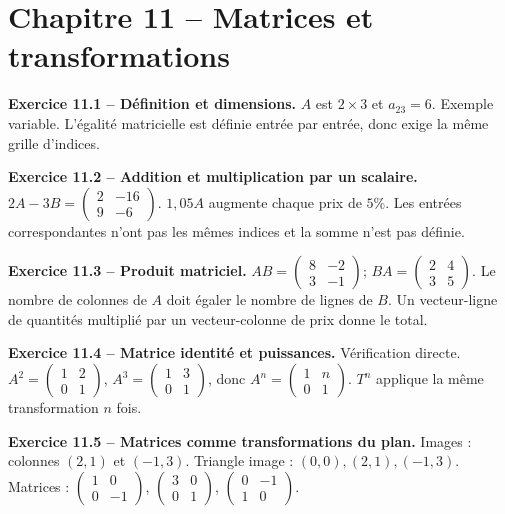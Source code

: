 \documentclass[11pt,a4paper,openany]{book}
\begin{document}
\chapter*{Chapitre 11 -- Matrices et transformations}
\begin{answerbox}
\textbf{Exercice 11.1 -- Définition et dimensions.} $A$ est $2\times3$ et $a_{23}=6$. Exemple variable. L'égalité matricielle est définie entrée par entrée, donc exige la même grille d'indices.\par
\textbf{Exercice 11.2 -- Addition et multiplication par un scalaire.} $2A-3B=\begin{pmatrix}2&-16\\9&-6\end{pmatrix}$. $1{,}05A$ augmente chaque prix de $5\%$. Les entrées correspondantes n'ont pas les mêmes indices et la somme n'est pas définie.\par
\textbf{Exercice 11.3 -- Produit matriciel.} $AB=\begin{pmatrix}8&-2\\3&-1\end{pmatrix}$; $BA=\begin{pmatrix}2&4\\3&5\end{pmatrix}$. Le nombre de colonnes de $A$ doit égaler le nombre de lignes de $B$. Un vecteur-ligne de quantités multiplié par un vecteur-colonne de prix donne le total.\par
\textbf{Exercice 11.4 -- Matrice identité et puissances.} Vérification directe. $A^2=\begin{pmatrix}1&2\\0&1\end{pmatrix}$, $A^3=\begin{pmatrix}1&3\\0&1\end{pmatrix}$, donc $A^n=\begin{pmatrix}1&n\\0&1\end{pmatrix}$. $T^n$ applique la même transformation $n$ fois.\par
\textbf{Exercice 11.5 -- Matrices comme transformations du plan.} Images : colonnes $(2,1)$ et $(-1,3)$. Triangle image : $(0,0),(2,1),(-1,3)$. Matrices : $\begin{pmatrix}1&0\\0&-1\end{pmatrix}$, $\begin{pmatrix}3&0\\0&1\end{pmatrix}$, $\begin{pmatrix}0&-1\\1&0\end{pmatrix}$.\par

\end{answerbox}
\end{document}
